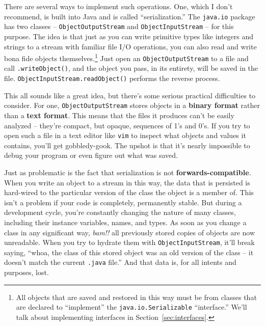 There are several ways to implement such operations. One, which I don't
recommend, is built into Java and is called ``serialization.'' The
\texttt{java.io} package has two classes -- \texttt{ObjectOutputStream} and
\texttt{ObjectInputStream} -- for this purpose. The idea is that just as you can
write primitive types like integers and strings to a stream with familiar file
I/O operations, you can also read and write bona fide objects
themselves.\footnote{All objects that are saved and restored in this way must
be from classes that are declared to ``implement'' the
\texttt{java.io.Serializable} ``interface.'' We'll talk about implementing
interfaces in Section~\ref{sec:interfaces}.} Just open an
\texttt{ObjectOutputStream} to a file and call \texttt{.writeObject()}, and
the object you pass, in its entirety, will be saved in the file.
\texttt{ObjectInputStream.readObject()} performs the reverse process.

This all sounds like a great idea, but there's some serious practical
difficulties to consider. For one, \texttt{ObjectOutputStream} stores objects
in a \textbf{binary format} rather than a \textbf{text format}. This means
that the files it produces can't be easily analyzed -- they're compact, but
opaque, sequences of 1's and 0's. If you try to open such a file in a text
editor like \texttt{vim} to inspect what objects and values it contains,
you'll get gobbledy-gook. The upshot is that it's nearly impossible to debug
your program or even figure out what was saved.

Just as problematic is the fact that serialization is not
\textbf{forwards-compatible}. When you write an object to a stream in this
way, the data that is persisted is hard-wired to the particular version of the
class the object is a member of. This isn't a problem if your code is
completely, permanently stable. But during a development cycle, you're
constantly changing the nature of many classes, including their instance
variables, names, and types. As soon as you change a class in any significant
way, \textit{bam!!} all previously stored copies of objects are now
unreadable. When you try to hydrate them with \texttt{ObjectInputStream},
it'll break saying, ``whoa, the class of this stored object was an old version
of the class -- it doesn't match the current \texttt{.java} file.'' And that
data is, for all intents and purposes, lost.

